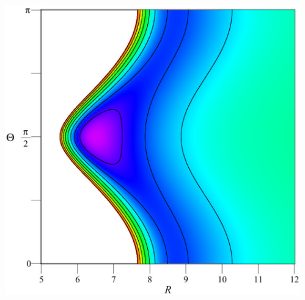 \documentclass[
  20pt,
  a0paper,
  portrait,
  margin=0mm,
  innermargin=15mm,
  blockverticalspace=0mm,
  colspace=0mm,
  subcolspace=0mm
]{tikzposter}
\begin{document}
\begin{columns}
{{\begin{minipage}{0.5\linewidth}
\begin{tikzfigure}
		\label{fig:coordsys}
\end{tikzfigure}
\end{minipage}
\begin{minipage}{0.5\linewidth}
		\begin{tikzfigure}
		\vspace{1cm}
		\includegraphics[width=0.55\linewidth]{../pictures/potential/potential.pdf}
		\label{fig:potential}
\end{tikzfigure}
\end{minipage}

}}
\end{columns}
\end{document}
